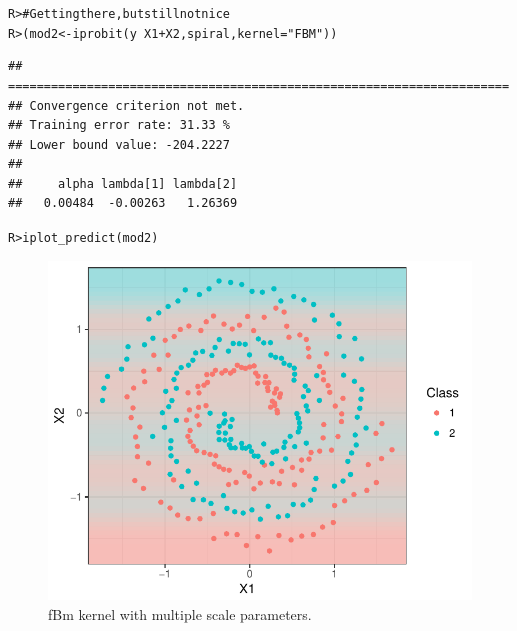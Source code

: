 \documentclass[a4paper,showframe,11pt]{report}\usepackage[]{graphicx}\usepackage[]{color}
\makeatletter
\newcommand{\hlstr}[1]{\textcolor[rgb]{0.063,0.58,0.627}{#1}}%
\newcommand{\hlcom}[1]{\textcolor[rgb]{0.588,0.588,0.588}{#1}}%
\newcommand{\hlopt}[1]{\textcolor[rgb]{0.196,0.196,0.196}{#1}}%
\newcommand{\hlstd}[1]{\textcolor[rgb]{0.196,0.196,0.196}{#1}}%
\newcommand{\hlkwb}[1]{\textcolor[rgb]{0.627,0,0.314}{#1}}%
\newcommand{\hlkwc}[1]{\textcolor[rgb]{0,0.631,0.314}{#1}}%
\newcommand{\hlkwd}[1]{\textcolor[rgb]{0.78,0.227,0.412}{#1}}%
\newenvironment{kframe}{%
 \def\at@end@of@kframe{}%
 \ifinner\ifhmode%
  \def\at@end@of@kframe{\end{minipage}}%
  \begin{minipage}{\columnwidth}%
 \fi\fi%
 \def\FrameCommand##1{\hskip\@totalleftmargin \hskip-\fboxsep
 \colorbox{shadecolor}{##1}\hskip-\fboxsep
     \hskip-\linewidth \hskip-\@totalleftmargin \hskip\columnwidth}%
 \MakeFramed {\advance\hsize-\width
   \@totalleftmargin\z@ \linewidth\hsize
   \@setminipage}}%
 {\par\unskip\endMakeFramed%
 \at@end@of@kframe}
\newenvironment{knitrout}{}{} %
\makeatother
\begin{document}
\begin{knitrout}
\color{fgcolor}\begin{kframe}
\begin{alltt}
\hlstd{R> }\hlcom{# Getting there, but still not nice}
\hlstd{R> }\hlstd{(mod2} \hlkwb{<-} \hlkwd{iprobit}\hlstd{(y} \hlopt{~} \hlstd{X1} \hlopt{+} \hlstd{X2, spiral,} \hlkwc{kernel} \hlstd{=} \hlstr{"FBM"}\hlstd{))}
\end{alltt}
\begin{verbatim}
## ======================================================================
## Convergence criterion not met.
## Training error rate: 31.33 %
## Lower bound value: -204.2227 
## 
##     alpha lambda[1] lambda[2] 
##   0.00484  -0.00263   1.26369
\end{verbatim}
\begin{alltt}
\hlstd{R> }\hlkwd{iplot_predict}\hlstd{(mod2)}
\end{alltt}
\end{kframe}\begin{figure}[h]

{\centering \includegraphics[width=0.7\linewidth]{figure/spiral_fbm-1} 

}

\caption[fBm kernel with multiple scale parameters]{fBm kernel with multiple scale parameters.}\label{fig:spiral_fbm}
\end{figure}


\end{knitrout}
\end{document}
